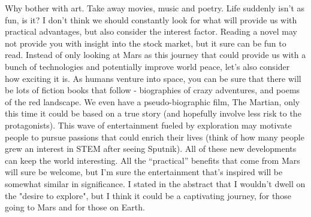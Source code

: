 \documentclass[main.tex]{subfiles}
\begin{document}
Why bother with art. Take away movies, music and poetry. Life suddenly isn't as fun, is it? I don't think we should constantly look for what will provide us with practical advantages, but also consider the interest factor. Reading a novel may not provide you with insight into the stock market, but it sure can be fun to read. Instead of only looking at Mars as this journey that could provide us with a bunch of technologies and potentially improve world peace, let's also consider how exciting it is. As humans venture into space, you can be sure that there will be lots of fiction books that follow - biographies of crazy adventures, and poems of the red landscape. We even have a pseudo-biographic film, The Martian, only this time it could be based on a true story (and hopefully involve less risk to the protagonists). This wave of entertainment fueled by exploration may motivate people to pursue passions that could enrich their lives (think of how many people grew an interest in STEM after seeing Sputnik). All of these new developments can keep the world interesting. All the “practical” benefits that come from Mars will sure be welcome, but I'm sure the entertainment that's inspired will be somewhat similar in significance. I stated in the abstract that I wouldn't dwell on the "desire to explore", but I think it could be a captivating journey, for those going to Mars and for those on Earth.
\end{document}
